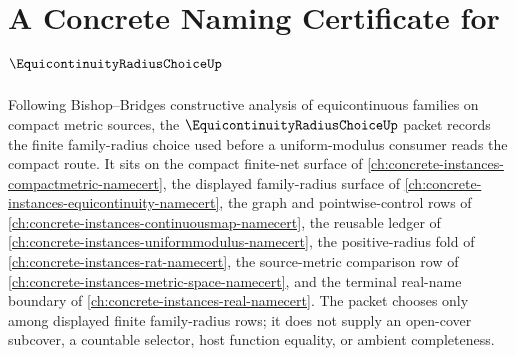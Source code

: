 \chapter{A Concrete Naming Certificate for $\EquicontinuityRadiusChoiceUp$}
\label{ch:concrete-instances-equicontinuity-radius-choice-namecert}

Following Bishop--Bridges constructive analysis of equicontinuous families on compact metric sources, the $\EquicontinuityRadiusChoiceUp$ packet records the finite family-radius choice used before a uniform-modulus consumer reads the compact route. It sits on the compact finite-net surface of \autoref{ch:concrete-instances-compactmetric-namecert}, the displayed family-radius surface of \autoref{ch:concrete-instances-equicontinuity-namecert}, the graph and pointwise-control rows of \autoref{ch:concrete-instances-continuousmap-namecert}, the reusable ledger of \autoref{ch:concrete-instances-uniformmodulus-namecert}, the positive-radius fold of \autoref{ch:concrete-instances-rat-namecert}, the source-metric comparison row of \autoref{ch:concrete-instances-metric-space-namecert}, and the terminal real-name boundary of \autoref{ch:concrete-instances-real-namecert}. The packet chooses only among displayed finite family-radius rows; it does not supply an open-cover subcover, a countable selector, host function equality, or ambient completeness.


